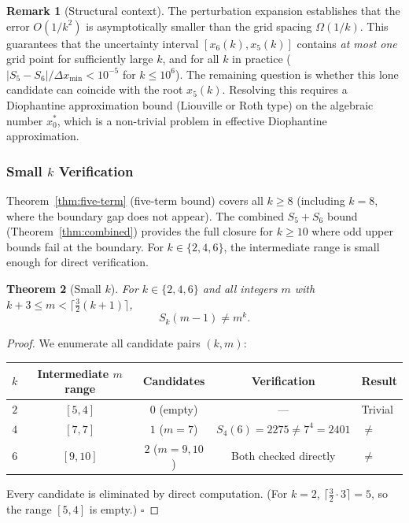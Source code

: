 \documentclass[12pt,a4paper]{article}
\theoremstyle{plain}
\newtheorem{theorem}{Theorem}[section]
\theoremstyle{definition}
\newtheorem{remark}[theorem]{Remark}
\begin{document}
\begin{remark}[Structural context]
  The perturbation expansion establishes that the error $O(1/k^2)$ is
  asymptotically smaller than the grid spacing $\Omega(1/k)$.  This
  guarantees that the uncertainty interval $[x_6(k), x_5(k)]$ contains
  \emph{at most one} grid point for sufficiently large $k$, and for
  all $k$ in practice ($|S_5-S_6|/\Delta x_{\min} < 10^{-5}$ for
  $k \le 10^6$).  The remaining question is whether this lone candidate
  can coincide with the root $x_5(k)$.  Resolving this requires a
  Diophantine approximation bound (Liouville or Roth type) on the
  algebraic number $x_0^*$, which is a non-trivial problem in effective
  Diophantine approximation.
\end{remark}

\subsubsection{Small $k$ Verification}
\label{sec:small-k}

Theorem~\ref{thm:five-term} (five-term bound) covers all $k \ge 8$
(including $k=8$, where the boundary gap does not appear).
The combined $S_5+S_6$ bound (Theorem~\ref{thm:combined}) provides
the full closure for $k \ge 10$ where odd upper bounds fail at the
boundary.  For $k \in \{2, 4, 6\}$, the intermediate range is small
enough for direct verification.

\begin{theorem}[Small $k$]\label{thm:small-k}
  For $k \in \{2, 4, 6\}$ and all integers $m$ with
  $k+3 \le m < \lceil\frac{3}{2}(k+1)\rceil$,
  \[
    S_k(m-1) \neq m^k.
  \]
\end{theorem}

\begin{proof}
  We enumerate all candidate pairs $(k,m)$:
  \begin{center}
  \begin{tabular}{ccccl}
  \toprule
  $k$ & Intermediate $m$ range & Candidates & Verification & Result \\
  \midrule
  $2$ & $[5, 4]$ & $0$ (empty) & --- & Trivial \\
  $4$ & $[7, 7]$ & $1$ ($m=7$) &
    $S_4(6) = 2275 \neq 7^4 = 2401$ & $\neq$ \\
  $6$ & $[9, 10]$ & $2$ ($m=9,10$) & Both checked directly & $\neq$ \\
  \bottomrule
  \end{tabular}
  \end{center}
  Every candidate is eliminated by direct computation.
  (For $k=2$, $\lceil\frac{3}{2}\cdot 3\rceil = 5$, so the range
  $[5,4]$ is empty.)
  \hfill$\square$
\end{proof}
\end{document}
